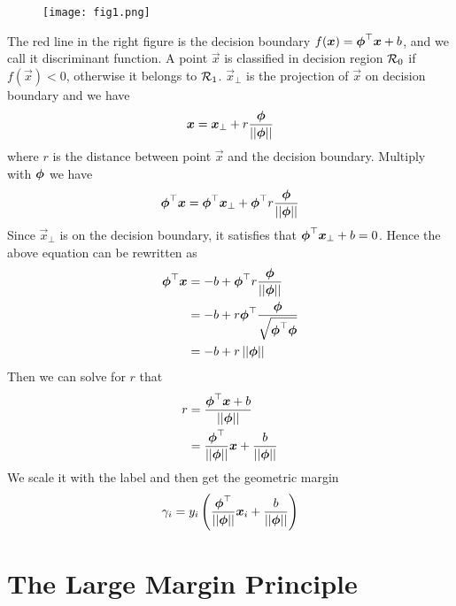 \begin{wrapfigure}{r}{0.4\textwidth}
	\texttt{[image: fig1.png]}
\end{wrapfigure}
The red line in the right figure is the decision boundary $f(\boldsymbol{x})=\boldsymbol{\phi}^\top\boldsymbol{x}+b$, and we call it discriminant function. A point $\vec{x}$ is classified in decision region $\mathcal{R}_0$ if $f(\vec{x})<0$, otherwise it belongs to $\mathcal{R}_1$. $\vec{x}_\bot$ is the projection of $\vec{x}$ on decision boundary and we have
\begin{align*}
	\boldsymbol{x}=\boldsymbol{x}_\bot+r\frac{\boldsymbol{\phi}}{\left\vert\left\vert \boldsymbol{\phi} \right\vert\right\vert}
\end{align*}
where $r$ is the distance between point $\vec{x}$ and the decision boundary. Multiply with $\boldsymbol{\phi}$ we have
\begin{align*}
	\boldsymbol{\phi}^\top\boldsymbol{x}=\boldsymbol{\phi}^\top\boldsymbol{x}_\bot+\boldsymbol{\phi}^\top r\frac{\boldsymbol{\phi}}{\left\vert\left\vert \boldsymbol{\phi} \right\vert\right\vert}
\end{align*}
Since $\vec{x}_\bot$ is on the decision boundary, it satisfies that $\boldsymbol{\phi}^\top\boldsymbol{x}_\bot+b=0$. Hence the above equation can be rewritten as
\begin{align*}
	\boldsymbol{\phi}^\top\boldsymbol{x}&=-b+\boldsymbol{\phi}^\top r\frac{\boldsymbol{\phi}}{\left\vert\left\vert \boldsymbol{\phi} \right\vert\right\vert} \\
	&=-b+r\boldsymbol{\phi}^\top\frac{\boldsymbol{\phi}}{\sqrt{\boldsymbol{\phi}^\top\boldsymbol{\phi}}} \\
	&=-b+r\left\vert\left\vert \boldsymbol{\phi} \right\vert\right\vert
\end{align*}
Then we can solve for $r$ that
\begin{align*}
	r&=\frac{\boldsymbol{\phi}^\top\boldsymbol{x}+b}{\left\vert\left\vert \boldsymbol{\phi} \right\vert\right\vert} \\
	&=\frac{\boldsymbol{\phi}^\top}{\left\vert\left\vert \boldsymbol{\phi} \right\vert\right\vert}\boldsymbol{x}+\frac{b}{\left\vert\left\vert \boldsymbol{\phi} \right\vert\right\vert}
\end{align*}
We scale it with the label and then get the geometric margin
\begin{align*}
	\gamma_i=y_i\left(\frac{\boldsymbol{\phi}^\top}{\left\vert\left\vert \boldsymbol{\phi} \right\vert\right\vert}\boldsymbol{x}_i+\frac{b}{\left\vert\left\vert \boldsymbol{\phi} \right\vert\right\vert}\right)
\end{align*}



\section{The Large Margin Principle}
\label{section8.2}

